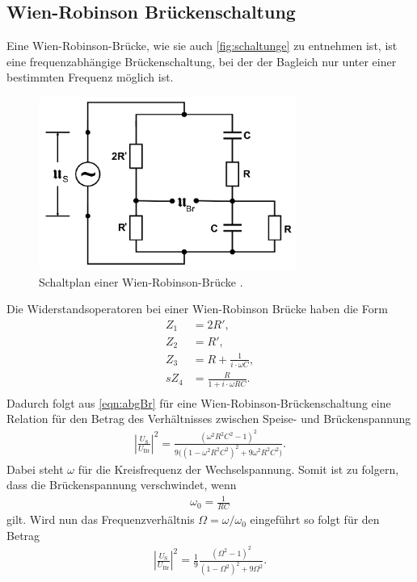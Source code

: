 \subsection{Wien-Robinson Brückenschaltung}
Eine Wien-Robinson-Brücke, wie sie auch \autoref{fig:schaltunge} zu entnehmen ist, ist eine frequenzabhängige 
Brückenschaltung, bei der der Bagleich nur unter einer bestimmten Frequenz möglich ist.
\begin{figure}[H]
    \centering
    \includegraphics[width=0.75\textwidth]{dateien/aufgabee).png}
    \caption{Schaltplan einer Wien-Robinson-Brücke .}
    \label{fig:schaltunge}
\end{figure}

\sloppy
Die Widerstandsoperatoren bei einer Wien-Robinson Brücke haben die Form
\begin{align*}
    Z_1 &= 2R', \\
    Z_2 &= R' , \\
    Z_3 &= R + \frac{1}{i\cdot\omega C} , \\s
    Z_4 &= \frac{R}{1+i\cdot\omega RC} . \\
\end{align*}
Dadurch folgt aus \autoref{eqn:abgBr} für eine Wien-Robinson-Brückenschaltung eine Relation für den Betrag des Verhältnisses
zwischen Speise- und Brückenspannung
\begin{align*}
    |\frac{U_{\text{S}}}{U_{\text{Br}}}|^2 = \frac{(\omega^2 R^2C^2-1)^2}{9\Big((1-\omega^2R^2C^2)^2 + 9\omega^2R^2C^2\Big)}.
    \label{eqn:theo}
\end{align*}
Dabei steht $\omega$ für die Kreisfrequenz der Wechselspannung.
Somit ist zu folgern, dass die Brückenspannung verschwindet, wenn 
\begin{align*}
    \omega_0 = \frac{1}{RC}
\end{align*}
gilt. Wird nun das Frequenzverhältnis $\Omega = \omega/\omega_0$ eingeführt so folgt für den Betrag
\begin{align}
    |\frac{U_{\text{S}}}{U_{\text{Br}}}|^2 = \frac 19 \frac{(\Omega^2-1)^2}{(1-\Omega^2)^2+9\Omega^2}.
    \label{eqn:wienRGl}
\end{align}

